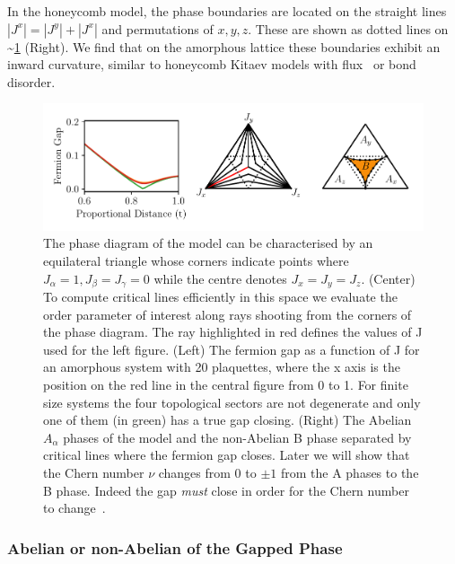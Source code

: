 In the honeycomb model, the phase boundaries are located on the straight lines \(|J^x| = |J^y| + |J^x|\) and permutations of \(x,y,z\). These are shown as dotted lines on \textasciitilde{}\cref{fig:phase_diagram} (Right). We find that on the amorphous lattice these boundaries exhibit an inward curvature, similar to honeycomb Kitaev models with flux~\autocite{Nasu_Thermal_2015} or bond~\autocite{knolle_dynamics_2016} disorder.

\hypertarget{fig:phase_diagram}{%
\begin{figure}
\centering
\includegraphics[width=1\textwidth,height=\textheight]{figure_code/amk_chapter/results/phase_diagram/phase_diagram}
\caption[{The Ground State Phase Diagram}]{The phase diagram of the model can be characterised by an equilateral triangle whose corners indicate points where \(J_\alpha = 1, J_\beta = J_\gamma = 0\) while the centre denotes \(J_x = J_y = J_z\). (Center) To compute critical lines efficiently in this space we evaluate the order parameter of interest along rays shooting from the corners of the phase diagram. The ray highlighted in red defines the values of J used for the left figure. (Left) The fermion gap as a function of J for an amorphous system with 20 plaquettes, where the x axis is the position on the red line in the central figure from 0 to 1. For finite size systems the four topological sectors are not degenerate and only one of them (in green) has a true gap closing. (Right) The Abelian \(A_\alpha\) phases of the model and the non-Abelian B phase separated by critical lines where the fermion gap closes. Later we will show that the Chern number \(\nu\) changes from \(0\) to \(\pm 1\) from the A phases to the B phase. Indeed the gap \emph{must} close in order for the Chern number to change~\autocite{ezawaTopologicalPhaseTransition2013}.}
\label{fig:phase_diagram}
\end{figure}
}

\hypertarget{abelian-or-non-abelian-of-the-gapped-phase}{%
\subsubsection{Abelian or non-Abelian of the Gapped Phase}\label{abelian-or-non-abelian-of-the-gapped-phase}}

